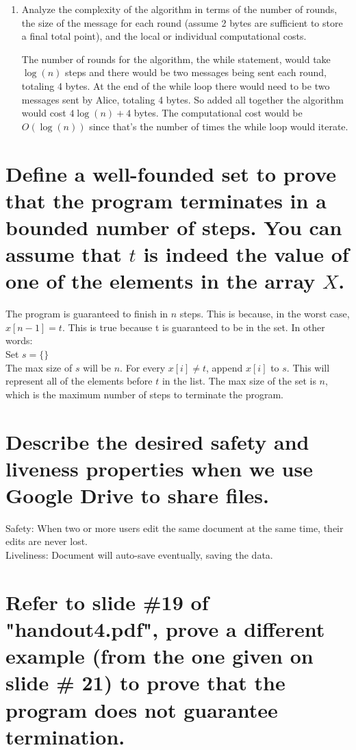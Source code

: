 \documentclass[times]{article}
\begin{document}
\begin{enumerate}
	 	
	 	\item Analyze the complexity of the algorithm in terms of the number of rounds, the size of the message for each round (assume 2 bytes are sufficient to store a final total point), and the local or individual computational costs.
	 	
	 	The number of rounds for the algorithm, the while statement, would take $\log(n)$ steps and there would be two messages being sent each round, totaling 4 bytes. At the end of the while loop there would need to be two messages sent by Alice, totaling 4 bytes. So added all together the algorithm would cost $4\log(n)+4$ bytes. The computational cost would be $O(\log(n))$ since that's the number of times the while loop would iterate.
	 \end{enumerate}

	\section{Define a well-founded set to prove that the program terminates in a bounded number of steps. You can assume that $t$ is indeed the value of one of the elements in the array $X$.}%

	The program is guaranteed to finish in $n$ steps. This is because, in the worst case, $x[n-1] = t$. This is true because t is guaranteed to be in the set. In other words: \\
	Set $s = \{\}$ \\
	The max size of $s$ will be $n$. For every $x[i] \ne t$, append $x[i]$ to $s$. This will represent all of the elements before $t$ in the list. The max size of the set is $n$, which is the maximum number of steps to terminate the program.

	\section{Describe the desired safety and liveness properties when we use Google	Drive to share files.}%

	Safety: When two or more users edit the same document at the same time, their edits are never lost. \\ Liveliness: Document will auto-save eventually, saving the data.

	\section{Refer to slide \#19 of "handout4.pdf", prove a different example (from	the one given on slide \# 21) to prove that the program does not guarantee termination.}%
\end{document}
